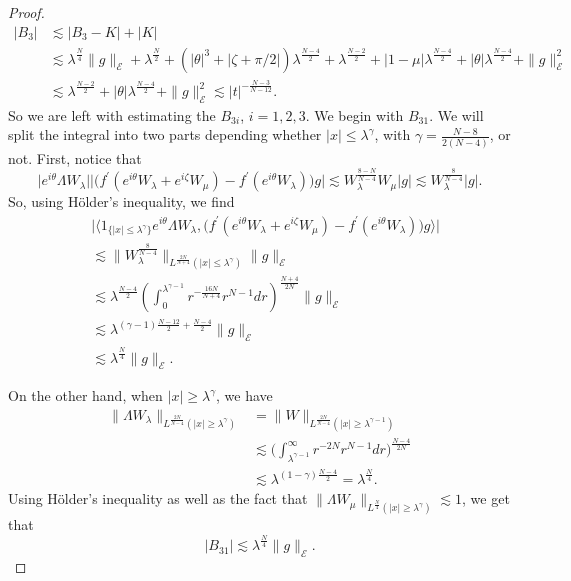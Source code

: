 \documentclass[a4paper,two-side,10pt]{amsart}
\numberwithin{equation}{section}
\begin{document}
\begin{proof}
\begin{align*}
|B_3|&\lesssim |B_3 -K |+|K|\\
&\lesssim \lambda^{\frac{N}{4} } \|g\|_{\mathcal{E}} +\lambda^{\frac{N}{2}}+  ( |\theta|^3 + |\zeta +\pi /2| ) \lambda^{\frac{N-4}{2}} +  \lambda^{\frac{N-2}{2}} +|1-\mu| \lambda^{\frac{N-4}{2}} + |\theta| \lambda^{\frac{N-4}{2}}+ \|g\|^2_{\mathcal{E}} \\
&\lesssim \lambda^{\frac{N-2}{2}} + |\theta|\lambda^{\frac{N-4}{2}}+ \|g\|^2_{\mathcal{E}}
\lesssim 
|t|^{-\frac{N-3}{N-12}}.
\end{align*}
So we are left with estimating the $B_{3i}$, $i=1,2,3$. We begin with $B_{31}$. We will split the integral into two parts depending whether 
 $|x|\leq \lambda^\gamma$, with $\gamma =\frac{N-8}{2(N-4)}$, or not. First, notice that
$$\big|  e^{i\theta}  \Lambda W_\lambda \big|\big|\big(f^\prime (e^{i\theta} W_\lambda +e^{i\zeta} W_\mu) - f^\prime (e^{i\theta} W_\lambda) \big)g\big|\lesssim W_\lambda^{\frac{8-N}{N-4}} W_\mu |g|\lesssim W_\lambda^{\frac{8}{N-4}} |g|  .$$
So, using H\"older's inequality, we find
\begin{align*}
 &\big| \big\langle 1_{\{|x|\leq \lambda^\gamma \}}  e^{i\theta}  \Lambda W_\lambda , \big( f^\prime (e^{i\theta} W_\lambda +e^{i\zeta} W_\mu) - f^\prime (e^{i\theta} W_\lambda )\big) g \big\rangle \big| \\ 
&\lesssim \|W_\lambda^{\frac{8}{N-4}}\|_{L^{\frac{2N}{N+4}} (|x|\leq \lambda^\gamma)} \|g\|_{\mathcal{E}} \\
&\lesssim \lambda^{\frac{N-4}{2}} \left(\int_0^{\lambda^{\gamma -1}}  r^{-\frac{16N}{N+4}} r^{N-1}dr\right)^{\frac{N+4}{2N}} \|g\|_{\mathcal{E}}\\
&\lesssim \lambda^{(\gamma -1) \frac{N- 12}{2} +\frac{N-4}{2}} \|g\|_{\mathcal{E}}\\
&\lesssim \lambda^{\frac{N}{4}} \|g\|_{\mathcal{E}}.
\end{align*}


On the other hand, when $|x|\geq \lambda^\gamma$, we have
\begin{align*}
\|\Lambda W_\lambda \|_{L^{\frac{2N}{N-4}}(|x|\geq \lambda^\gamma) } &= \|W\|_{L^{\frac{2N}{N-4}} (|x| \geq \lambda^{\gamma -1})} \\
&\lesssim \Big(\int_{\lambda^{\gamma -1} }^\infty r^{-2N} r^{N-1} dr \Big)^{\frac{N-4}{2N}}\\
&\lesssim \lambda^{(1-\gamma)\frac{N-4}{2}}=\lambda^{\frac{N}{4}}.
\end{align*}
Using H\" older's inequality as well as the fact that $ \|\Lambda W_\mu\|_{L^{\frac{N}{4}}(|x|\geq  \lambda^\gamma)} \lesssim 1$, we get that
$$|B_{31}|\lesssim  \lambda^{\frac{N}{4}} \|g\|_{\mathcal{E}}.$$


\end{proof}
\end{document}
